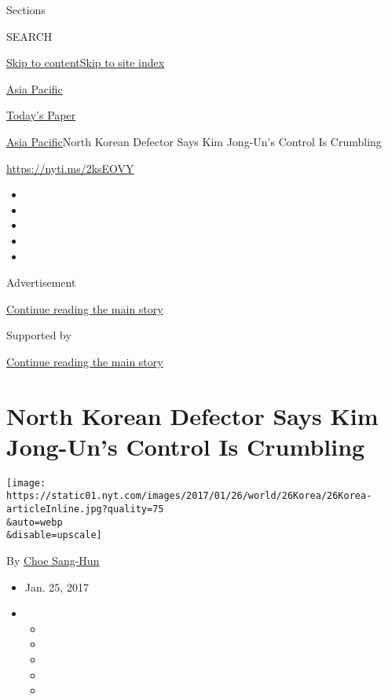 Sections

SEARCH

\protect\hyperlink{site-content}{Skip to
content}\protect\hyperlink{site-index}{Skip to site index}

\href{https://www.nytimes.com/section/world/asia}{Asia Pacific}

\href{https://myaccount.nytimes.com/auth/login?response_type=cookie\&client_id=vi}{}

\href{https://www.nytimes.com/section/todayspaper}{Today's Paper}

\href{/section/world/asia}{Asia Pacific}\textbar{}North Korean Defector
Says Kim Jong-Un's Control Is Crumbling

\url{https://nyti.ms/2ksEOVY}

\begin{itemize}
\item
\item
\item
\item
\item
\end{itemize}

Advertisement

\protect\hyperlink{after-top}{Continue reading the main story}

Supported by

\protect\hyperlink{after-sponsor}{Continue reading the main story}

\hypertarget{north-korean-defector-says-kim-jong-uns-control-is-crumbling}{%
\section{North Korean Defector Says Kim Jong-Un's Control Is
Crumbling}\label{north-korean-defector-says-kim-jong-uns-control-is-crumbling}}

\texttt{[image: https://static01.nyt.com/images/2017/01/26/world/26Korea/26Korea-articleInline.jpg?quality=75\\\&auto=webp\\\&disable=upscale]}

By \href{http://www.nytimes.com/by/choe-sang-hun}{Choe Sang-Hun}

\begin{itemize}
\item
  Jan. 25, 2017
\item
  \begin{itemize}
  \item
  \item
  \item
  \item
  \item
  \end{itemize}
\end{itemize}

